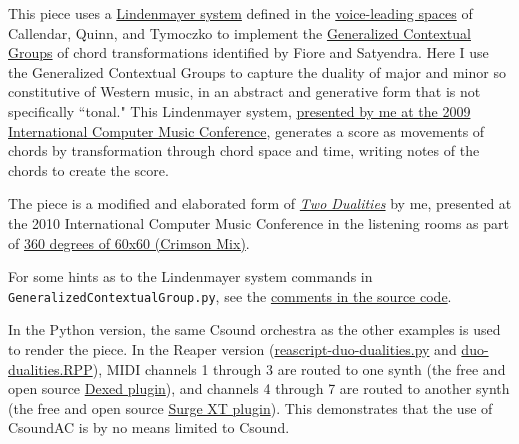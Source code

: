 \documentclass[letterpaper,10pt,DIV=12,parskip=half]{scrartcl}
\begin{document}
This piece uses a \href{https://algorithmicbotany.org/papers/abop/abop.pdf}{Lindenmayer system} defined in the \href{https://dmitri.mycpanel.princeton.edu/files/publications/science2.pdf}{voice-leading spaces} of Callendar, Quinn, and Tymoczko to implement the \href{https://www.mtosmt.org/issues/mto.05.11.3/mto.05.11.3.fiore_satyendra.pdf}{Generalized Contextual Groups} of chord transformations identified by Fiore and Satyendra. Here I use the Generalized Contextual Groups to capture the duality of major and minor so constitutive of Western music, in an abstract and generative form that is not specifically ``tonal." This Lindenmayer system, \href{https://citeseerx.ist.psu.edu/document?repid=rep1&type=pdf&doi=dd8623bbe8c889b2c56d6a1fc0fc55c61b362ee4}{presented by me at the 2009 International Computer Music Conference}, generates a score as movements of chords by transformation through chord space and time, writing notes of the chords to create the score. 

The piece is a modified and elaborated form of \href{https://music.youtube.com/watch?v=3_ahbL44p-E}{\emph{Two Dualities}} by me, presented at the 2010 International Computer Music Conference in the listening rooms as part of \href{http://www.voxnovus.com/60x60/2010_Crimson_Mix.htm}{360 degrees of 60x60 (Crimson Mix)}.

For some hints as to the Lindenmayer system commands in \lstinline|GeneralizedContextualGroup.py|, see the \href{https://github.com/gogins/csound-ac/blob/master/silencio/python/GeneralizedContextualGroup.py}{comments in the source code}.

In the Python version, the same Csound orchestra as the other examples is used to render the piece. In the Reaper version (\href{https://github.com/gogins/csound-ac/blob/master/user-guide/reascript-duo-dualities.py}{reascript-duo-dualities.py} and \href{https://github.com/gogins/csound-ac/blob/master/user-guide/duo-dualities.RPP}{duo-dualities.RPP}), MIDI channels 1 through 3 are routed to one synth (the free and open source \href{https://asb2m10.github.io/dexed/}{Dexed plugin}), and channels 4 through 7 are routed to another synth (the free and open source \href{https://surge-synthesizer.github.io/}{Surge XT plugin}). This demonstrates that the use of CsoundAC is by no means limited to Csound.
\end{document}
